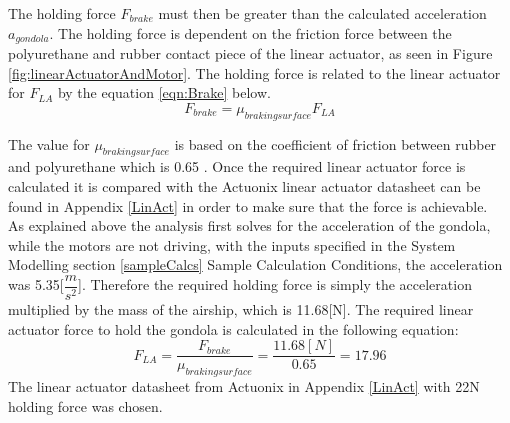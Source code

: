 \documentclass[../main.tex]{subfiles}
\begin{document}
The holding force $F_{brake}$ must then be greater than the calculated acceleration $a_{gondola}$. The holding force is dependent on the friction force between the polyurethane and rubber contact piece of the linear actuator, as seen in Figure \ref{fig:linearActuatorAndMotor}.  The holding force is related to the linear actuator for $F_{LA}$ by the equation \ref{eqn:Brake} below.
\begin{equation}
\label{eqn:Brake}
F_{brake} = \mu_{braking surface} F_{LA}
\end{equation}

The value for $\mu_{braking surface}$ is based on the coefficient of friction between rubber and polyurethane which is 0.65 \cite{Friction}. Once the required linear actuator force is calculated it is compared with the Actuonix linear actuator datasheet can be found in Appendix \ref{LinAct} in order to make sure that the force is achievable.\\

As explained above the analysis first solves for the acceleration of the gondola, while the motors are not driving, with the inputs specified in the System Modelling section \ref{sampleCalcs} Sample Calculation Conditions, the acceleration was 5.35[$\dfrac{m}{s^2}$]. Therefore the required holding force is simply the acceleration multiplied by the mass of the airship, which is 11.68[N]. The required linear actuator force to hold the gondola is calculated in the following equation:
\begin{equation*}
F_{LA} = \frac{F_{brake}}{\mu_{braking surface} } = \frac{11.68[N]}{0.65} = 17.96
\end{equation*}
The linear actuator datasheet from Actuonix in Appendix \ref{LinAct} with 22N holding force was chosen. 
\end{document}
